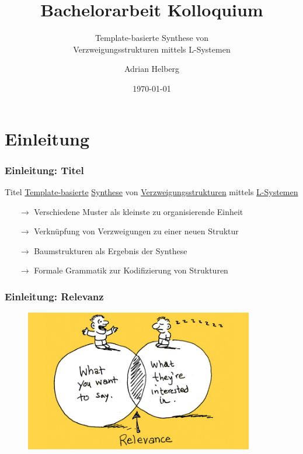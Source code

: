 \documentclass[12pt]{beamer}
\subtitle{Template-basierte Synthese von\\Verzweigungsstrukturen mittels L-Systemen}
\title{Bachelorarbeit Kolloquium}
\author{Adrian Helberg}
\institute{HAW Hamburg}
\date{\today}
\begin{document}
    \frame{\titlepage}

    \section{Einleitung}
    \label{sec:thema}
    \begin{frame}
        \frametitle{Einleitung: Titel}

        \begin{block}{Titel}
            \color{olive}\underline{\color{black}Template-basierte} \color{teal}\underline{\color{black}Synthese} 
            \color{black}von \color{orange}\underline{\color{black}Verzweigungsstrukturen} \color{black}mittels 
            \color{cyan}\underline{\color{black}L-Systemen}
        \end{block}

        \begin{itemize}
            \item[\color{olive}$\rightarrow$] \color{black}Verschiedene Muster als kleinste zu organisierende Einheit
            \item[\color{teal}$\rightarrow$] \color{black}Verknüpfung von Verzweigungen zu einer neuen Struktur
            \item[\color{orange}$\rightarrow$] \color{black}Baumstrukturen als Ergebnis der Synthese
            \item[\color{cyan}$\rightarrow$] \color{black}Formale Grammatik zur Kodifizierung von Strukturen
        \end{itemize}
    \end{frame}

    \begin{frame}
        \frametitle{Einleitung: Relevanz}

        \begin{figure}
            \centering
            \includegraphics[width=10cm]{../images/relevanz.jpg}
        \end{figure}
    \end{frame}
\end{document}

